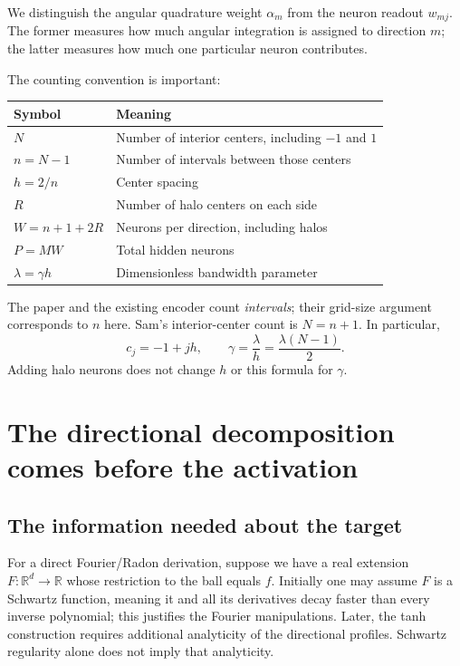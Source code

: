 \documentclass[11pt]{article}
\newcommand{\R}{\mathbb R}
\begin{document}
We distinguish the angular quadrature weight $\alpha_m$ from the neuron readout $w_{mj}$. The former measures how much angular integration is assigned to direction $m$; the latter measures how much one particular neuron contributes.

The counting convention is important:
\begin{center}
\begin{tabular}{@{}ll@{}}
\toprule
Symbol & Meaning \\
\midrule
$N$ & Number of interior centers, including $-1$ and $1$ \\
$n=N-1$ & Number of intervals between those centers \\
$h=2/n$ & Center spacing \\
$R$ & Number of halo centers on each side \\
$W=n+1+2R$ & Neurons per direction, including halos \\
$P=MW$ & Total hidden neurons \\
$\lambda=\gamma h$ & Dimensionless bandwidth parameter \\
\bottomrule
\end{tabular}
\end{center}
The paper and the existing encoder count \emph{intervals}; their grid-size argument corresponds to $n$ here. Sam's interior-center count is $N=n+1$. In particular,
\begin{equation}
 c_j=-1+jh,\qquad \gamma=\frac{\lambda}{h}=\frac{\lambda(N-1)}2.
 \label{eq:geometry}
\end{equation}
Adding halo neurons does not change $h$ or this formula for $\gamma$.

\section{The directional decomposition comes before the activation}
\subsection{The information needed about the target}

For a direct Fourier/Radon derivation, suppose we have a real extension $F:\R^d\to\R$ whose restriction to the ball equals $f$. Initially one may assume $F$ is a Schwartz function, meaning it and all its derivatives decay faster than every inverse polynomial; this justifies the Fourier manipulations. Later, the tanh construction requires additional analyticity of the directional profiles. Schwartz regularity alone does not imply that analyticity.
\end{document}
